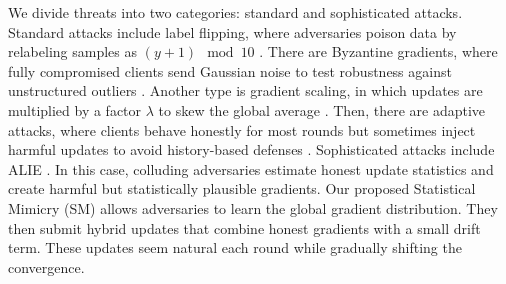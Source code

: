 \documentclass[lettersize,journal]{IEEEtran}
\begin{document}
{\begin{table}[b]
{\begin{tabular}{lll}
\bottomrule
\end{tabular}
}
\end{table}
We divide threats into two categories: standard and sophisticated attacks. Standard attacks include label flipping, where adversaries poison data by relabeling samples as \( (y+1) \mod 10 \) \cite{zhang2025sokbenchmarkingpoisoningattacks}. There are Byzantine gradients, where fully compromised clients send Gaussian noise to test robustness against unstructured outliers \cite{zhao2024understandingbyzantinerobustnessfederated}. Another type is gradient scaling, in which updates are multiplied by a factor \( \lambda \) to skew the global average \cite{yue2025advancinghybriddefensebyzantine}. Then, there are adaptive attacks, where clients behave honestly for most rounds but sometimes inject harmful updates to avoid history-based defenses \cite{zhao2024understandingbyzantinerobustnessfederated}. 
Sophisticated attacks include ALIE \cite{baruch2019littleenoughcircumventingdefenses}. In this case, colluding adversaries estimate honest update statistics and create harmful but statistically plausible gradients. Our proposed Statistical Mimicry (SM) allows adversaries to learn the global gradient distribution. They then submit hybrid updates that combine honest gradients with a small drift term. These updates seem natural each round while gradually shifting the convergence.




}
\end{document}
